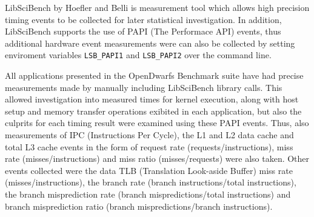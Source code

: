 \documentclass[../document.tex]{subfiles}
\begin{document}
\label{ssec:time}

LibSciBench by Hoefler and Belli \cite{hoefler2015scientific} is measurement
tool which allows high precision timing events to be collected for later
statistical investigation. In addition, LibSciBench supports the use of
PAPI (The Performace API) \cite{mucci1999papi} events, thus additional
hardware event measurements were can also be collected by setting enviroment
variables {\tt LSB_PAPI1} and {\tt LSB_PAPI2} over the command line.

All applications presented in the OpenDwarfs Benchmark suite have had precise
measurements made by manually including LibSciBench library calls. This allowed
investigation into measured times for kernel execution, along with host setup
and memory transfer operations exibited in each application, but also the
culprits for each timing result were examined using these PAPI events. Thus,
also measurements of IPC (Instructions Per Cycle), the L1 and L2 data cache
and total L3 cache events in the form of request rate (requests/instructions),
miss rate (misses/instructions) and miss ratio (misses/requests) were also
taken. Other events collected were the data TLB (Translation Look-aside Buffer)
miss rate (misses/instructions), the branch rate (branch instructions/total
instructions), the branch misprediction rate (branch mispredictions/total
instructions) and branch misprediction ratio (branch mispredictions/branch
instructions).
\end{document}
